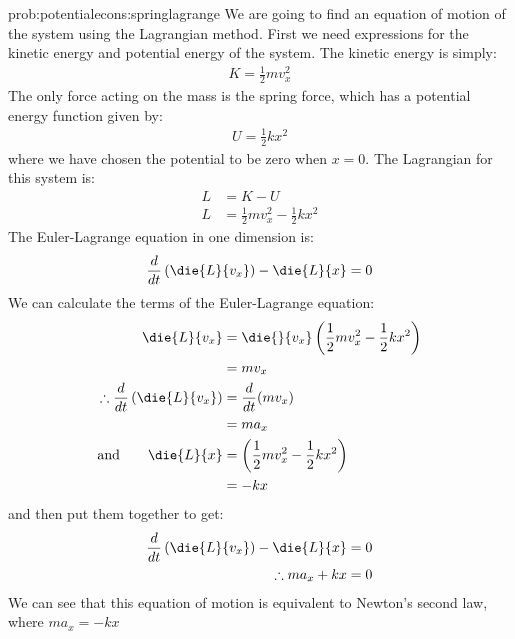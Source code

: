 \begin{solution}{prob:potentialecons:springlagrange}\label{soln:potentialecons:springlagrange} We are going to find an equation of motion of the system using the Lagrangian method. First we need expressions for the kinetic energy and potential energy of the system. The kinetic energy is simply:
\begin{align*}
K=\frac{1}{2}mv_x^2
\end{align*}
The only force acting on the mass is the spring force, which has a potential energy function given by:
\begin{align*} 
U=\frac{1}{2}kx^2
\end{align*}
where we have chosen the potential to be zero when $x=0$. The Lagrangian for this system is:
\begin{align*}
L&=K-U\\
L&=\frac{1}{2}mv_x^2-\frac{1}{2}kx^2
\end{align*}
The Euler-Lagrange equation in one dimension is:
\begin{align*}
\frac{d}{dt}\left(\die{L}{v_x}\right)-\die{L}{x} = 0
\end{align*}
We can calculate the terms of the Euler-Lagrange equation:
\begin{align*}
\die{L}{v_x}&=\die{}{v_x}\left(\frac{1}{2}mv_x^2-\frac{1}{2}kx^2\right)\\
&=mv_x\\
\therefore \frac{d}{dt}\left(\die{L}{v_x}\right)&=\frac{d}{dt}(mv_x)\\
&=ma_x\\
\textrm{and}\qquad \die{L}{x}&=\left(\frac{1}{2}mv_x^2-\frac{1}{2}kx^2\right)\\
&=-kx
\end{align*}
and then put them together to get:
\begin{align*}
\frac{d}{dt}\left(\die{L}{v_x}\right)-\die{L}{x} &= 0\\
\therefore ma_x+kx&=0\\
\end{align*}
We can see that this equation of motion is equivalent to Newton's second law, where $ma_x=-kx$
\end{solution}

